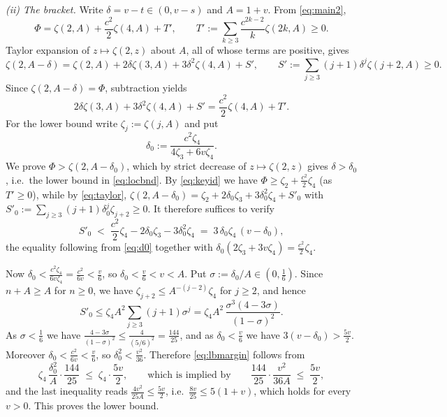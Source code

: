 \emph{(ii) The bracket.} Write $\delta=v-t\in(0,v-s)$ and $A=1+v$. From \eqref{eq:main2},
\begin{equation}\label{eq:keyid}
  \Phi=\zeta(2,A)+\frac{c^{2}}{2}\zeta(4,A)+T',\qquad
   T':=\sum_{k\ge3}\frac{c^{2k-2}}{k}\zeta(2k,A)\ge0 .
\end{equation}
Taylor expansion of $z\mapsto\zeta(2,z)$ about $A$, all of whose terms are positive, gives
\begin{equation}\label{eq:taylor}
  \zeta(2,A-\delta)=\zeta(2,A)+2\delta\zeta(3,A)+3\delta^{2}\zeta(4,A)+S',
  \qquad S':=\sum_{j\ge3}(j+1)\delta^{j}\zeta(j+2,A)\ge0 .
\end{equation}
Since $\zeta(2,A-\delta)=\Phi$, subtraction yields
\begin{equation}\label{eq:balance}
  2\delta\zeta(3,A)+3\delta^{2}\zeta(4,A)+S'=\frac{c^{2}}{2}\zeta(4,A)+T' .
\end{equation}
For the lower bound write $\zeta_{j}:=\zeta(j,A)$ and put
\begin{equation}\label{eq:d0}
  \delta_{0}:=\frac{c^{2}\zeta_{4}}{4\zeta_{3}+6v\zeta_{4}} .
\end{equation}
We prove $\Phi>\zeta(2,A-\delta_{0})$, which by strict decrease of $z\mapsto\zeta(2,z)$
gives $\delta>\delta_{0}$, i.e.\ the lower bound in \eqref{eq:locbnd}. By \eqref{eq:keyid}
we have $\Phi\ge\zeta_{2}+\frac{c^{2}}{2}\zeta_{4}$ (as $T'\ge0$), while by
\eqref{eq:taylor},
$\zeta(2,A-\delta_{0})=\zeta_{2}+2\delta_{0}\zeta_{3}+3\delta_{0}^{2}\zeta_{4}+S'_{0}$
with $S'_{0}:=\sum_{j\ge3}(j+1)\delta_{0}^{j}\zeta_{j+2}\ge0$. It therefore suffices to
verify
\begin{equation}\label{eq:lbmargin}
  S'_{0}\;<\;\frac{c^{2}}{2}\zeta_{4}-2\delta_{0}\zeta_{3}-3\delta_{0}^{2}\zeta_{4}
  \;=\;3\,\delta_{0}\zeta_{4}\,(v-\delta_{0}),
\end{equation}
the equality following from \eqref{eq:d0} together with
$\delta_{0}(2\zeta_{3}+3v\zeta_{4})=\frac{c^{2}}{2}\zeta_{4}$.

Now $\delta_{0}<\frac{c^{2}\zeta_{4}}{6v\zeta_{4}}=\frac{c^{2}}{6v}<\frac v6$, so
$\delta_{0}<\frac v6<v<A$. Put $\sigma:=\delta_{0}/A\in(0,\frac16)$. Since $n+A\ge A$ for
$n\ge0$, we have $\zeta_{j+2}\le A^{-(j-2)}\zeta_{4}$ for $j\ge2$, and hence
\[
  S'_{0}\le\zeta_{4}A^{2}\sum_{j\ge3}(j+1)\sigma^{j}
   =\zeta_{4}A^{2}\,\frac{\sigma^{3}(4-3\sigma)}{(1-\sigma)^{2}} .
\]
As $\sigma<\frac16$ we have $\frac{4-3\sigma}{(1-\sigma)^{2}}\le\frac{4}{(5/6)^{2}}
=\frac{144}{25}$, and as $\delta_{0}<\frac v6$ we have $3(v-\delta_{0})>\frac{5v}{2}$.
Moreover $\delta_{0}<\frac{c^{2}}{6v}<\frac{v}{6}$, so $\delta_{0}^{2}<\frac{v^{2}}{36}$.
Therefore \eqref{eq:lbmargin} follows from
\[
  \zeta_{4}\,\frac{\delta_{0}^{2}}{A}\cdot\frac{144}{25}\;\le\;\zeta_{4}\cdot\frac{5v}{2},
  \qquad\text{which is implied by}\qquad
  \frac{144}{25}\cdot\frac{v^{2}}{36A}\;\le\;\frac{5v}{2},
\]
and the last inequality reads $\frac{4v^{2}}{25A}\le\frac{5v}{2}$, i.e.\
$\frac{8v}{25}\le5(1+v)$, which holds for every $v>0$. This proves the lower bound.

